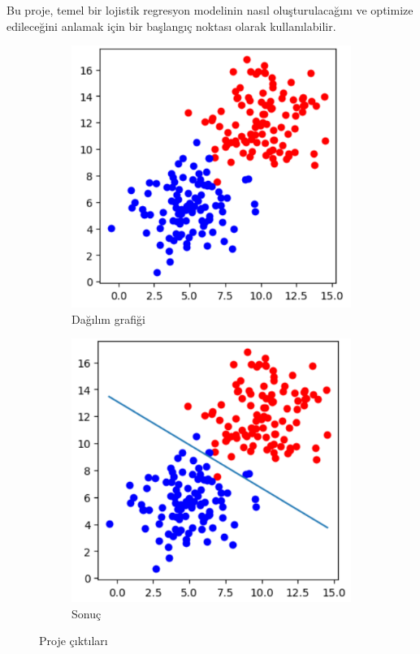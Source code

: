 \documentclass{article}
\begin{document}
\noindent Bu proje, temel bir lojistik regresyon modelinin nasıl oluşturulacağını ve optimize edileceğini anlamak için bir başlangıç noktası olarak kullanılabilir.
\begin{figure}[h]
    \centering
    \begin{subfigure}{0.5\textwidth}
        \centering
        \includegraphics[width=1\linewidth]{image/Resim54.PNG}
        \caption{Dağılım grafiği}
        \label{fig:resim1}
    \end{subfigure}%
    \begin{subfigure}{0.5\textwidth}
        \centering
        \includegraphics[width=1\linewidth]{image/Resim55.PNG}
        \caption{Sonuç}
        \label{fig:resim2}
    \end{subfigure}
    \caption{Proje çıktıları}
    \label{fig:iki_resim}
\end{figure}
\end{document}
